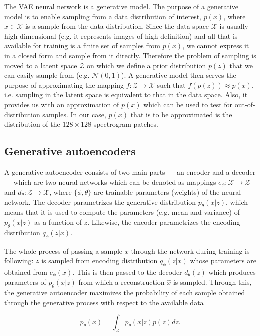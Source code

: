 The VAE neural network is a generative model. The purpose of a generative model is to enable sampling from a data distribution of interest,  $p(x)$, where $x \in \mathcal{X}$ is a sample from the data distribution. Since the data space $\mathcal{X}$ is usually high-dimensional (e.g. it represents images of high definition) and all that is available for training is a finite set of samples from $p(x)$, we cannot express it in a closed form and sample from it directly. Therefore the problem of sampling is moved to a latent space $\mathcal{Z}$ on which we define a prior distribution $p(z)$ that we can easily sample from (e.g. $\mathcal{N}(0,1)$). A generative model then serves the purpose of approximating the mapping $f: \mathcal{Z} \rightarrow \mathcal{X}$ such that $f(p(z)) \approx p(x) $, i.e. sampling in the latent space is equivalent to that in the data space. Also, it provides us with an approximation of $p(x)$ which can be used to test for out-of-distribution samples. In our case, $p(x)$ that is to be approximated is the distribution of the $128\times 128$ spectrogram patches.

\subsection{Generative autoencoders}
A generative autoencoder consists of two main parts --- an encoder and a decoder --- which are two neural networks which can be denoted as mappings $e_{\phi}:\mathcal{X} \rightarrow \mathcal{Z}$ and $d_{\theta}:\mathcal{Z} \rightarrow \mathcal{X}$, where $\lbrace \phi, \theta \rbrace$ are trainable parameters (weights) of the neural network. The decoder parametrizes the generative distribution $p_{\theta}(x|z)$, which means that it is used to compute the parameters (e.g. mean and variance) of $p_{\theta}(x|z)$ as a function of $z$. Likewise, the encoder parametrizes the encoding distribution $q_{\phi}(z|x)$. 

The whole process of passing a sample $x$ through the network during training is following: $z$ is sampled from encoding distribution $q_{\phi}(z|x)$ whose parameters are obtained from $e_{\phi}(x)$. This is then passed to the decoder $d_{\theta}(z)$ which produces parameters of $p_{\theta}(x|z)$ from which a reconstruction $\hat{x}$ is sampled. Through this, the generative autoencoder maximizes the probability of each sample obtained through the generative process with respect to the available data

\begin{equation}
  p_{\theta}(x) = \int_{\mathcal{Z}} p_{\theta}(x|z) p(z) dz.
  \label{eq:gen}
\end{equation}

